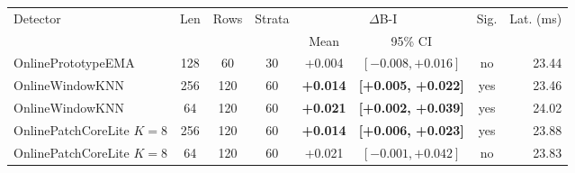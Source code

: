 \begin{tabular}{lccccccr}
\toprule
Detector & Len & Rows & Strata & \multicolumn{2}{c}{$\Delta$B-I} & Sig. & Lat. (ms) \\
\cmidrule(lr){5-6}
& & & & Mean & 95\% CI & & \\
\midrule
OnlinePrototypeEMA & 128 & 60 & 30 & +0.004 & $[-0.008, +0.016]$ & no & 23.44 \\
\midrule
OnlineWindowKNN & 256 & 120 & 60 & \textbf{+0.014} & \textbf{[+0.005, +0.022]} & yes & 23.46 \\
OnlineWindowKNN & 64 & 120 & 60 & \textbf{+0.021} & \textbf{[+0.002, +0.039]} & yes & 24.02 \\
\midrule
OnlinePatchCoreLite $K{=}8$ & 256 & 120 & 60 & \textbf{+0.014} & \textbf{[+0.006, +0.023]} & yes & 23.88 \\
OnlinePatchCoreLite $K{=}8$ & 64 & 120 & 60 & +0.021 & $[-0.001, +0.042]$ & no & 23.83 \\
\bottomrule
\end{tabular}
